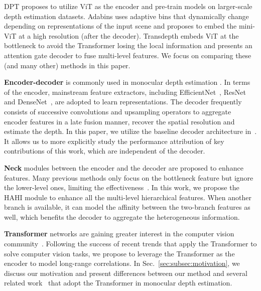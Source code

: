 \documentclass[twocolumn]{svjour3}    \pdfoutput=1
\begin{document}
DPT proposes to utilize ViT as the encoder and pre-train models on larger-scale depth estimation datasets. Adabins uses adaptive bins that dynamically change depending on representations of the input scene and proposes to embed the mini-ViT at a high resolution (after the decoder). Transdepth embeds ViT at the bottleneck to avoid the Transformer losing the local information and presents an attention gate decoder to fuse multi-level features. We focus on comparing these (and many other) methods in this paper.

\textbf{Encoder-decoder} is commonly used in monocular depth estimation \citep{eigen2014depth, fu2018deep, hu2019revisiting, lee2019bts, huynh2020guiding, yang2021transdepth, bhat2021adabins}. In terms of the encoder, mainstream feature extractors, including EfficientNet~\citep{tan2019efficientnet}, ResNet~\citep{he2016resenet} and DenseNet~\citep{huang2017densenet}, are adopted to learn representations. The decoder frequently consists of successive convolutions and upsampling operators to aggregate encoder features in a late fusion manner, recover the spatial resolution and estimate the depth. In this paper, we utilize the baseline decoder architecture in~\citep{alhashim2018densedepth}. It allows us to more explicitly study the performance attribution of key contributions of this work, which are independent of the decoder.

\textbf{Neck} modules between the encoder and the decoder are proposed to enhance features. Many previous methods only focus on the bottleneck feature but ignore the lower-level ones, limiting the effectiveness~\citep{fu2018deep, lee2019bts, huynh2020guiding, yang2021transdepth}. In this work, we propose the HAHI module to enhance all the multi-level hierarchical features. When another branch is available, it can model the affinity between the two-branch features as well, which benefits the decoder to aggregate the heterogeneous information.

\textbf{Transformer} networks are gaining greater interest in the computer vision community~\citep{dosovitskiy2020vit, liu2021swin, carion2020detr, zheng2021setr}. Following the success of recent trends that apply the Transformer to solve computer vision tasks, we propose to leverage the Transformer as the encoder to model long-range correlations. In Sec.~\ref{sec:subsec:motivation}, we discuss our motivation and present differences between our method and several related work~\citep{ranftl2021dpt, yang2021transdepth, bhat2021adabins} that adopt the Transformer in monocular depth estimation.
\end{document}
